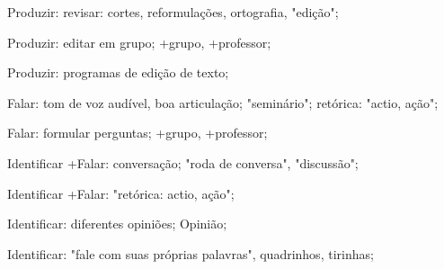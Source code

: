  Produzir: revisar: cortes, reformulações, ortografia, "edição";

 Produzir: editar em grupo; +grupo, +professor;

 Produzir: programas de edição de texto;

 Falar: tom de voz audível, boa articulação; "seminário"; retórica: "actio, ação"; 

 Falar: formular perguntas; +grupo, +professor;

 Identificar +Falar: conversação; "roda de conversa", "discussão";

 Identificar +Falar: "retórica: actio, ação";

 Identificar: diferentes opiniões; Opinião; 

 Identificar: "fale com suas próprias palavras", quadrinhos, tirinhas;

